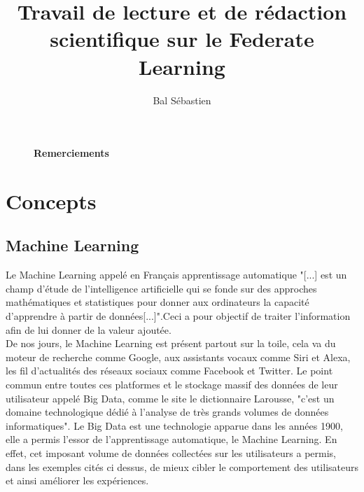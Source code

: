\documentclass[12pt,a4paper]{report}
\begin{document}
\title{\Large{\Large {Travail de lecture et de rédaction scientifique sur le Federate Learning}}}

\author{Bal Sébastien}

\maketitle

\thispagestyle{empty} %





 


\begin{figure}[p]

\large\textbf{Remerciements}


\end{figure}

\tableofcontents
\thispagestyle{empty} %


\chapter{Concepts}
\section{Machine Learning}


\thispagestyle{plain}
\setcounter{page}{1} %


Le Machine Learning appelé en Français apprentissage automatique "[...] est un champ d'étude de l'intelligence artificielle qui se fonde sur des approches mathématiques et statistiques pour donner aux ordinateurs la capacité d'apprendre à partir de données[...]".Ceci a pour objectif de traiter l'information afin de lui donner de la valeur ajoutée.\\

De nos jours, le Machine Learning est présent partout sur la toile, cela va du moteur de recherche comme Google, aux assistants vocaux comme Siri et Alexa, les fil d'actualités des réseaux sociaux comme Facebook et Twitter. Le point commun entre toutes ces platformes et le stockage massif des données de leur utilisateur appelé Big Data, comme le site le dictionnaire Larousse, "c'est un domaine technologique dédié à l'analyse de très grands volumes de données informatiques". Le Big Data est une technologie apparue dans les années 1900, elle a permis l'essor de l'apprentissage automatique, le Machine Learning. En effet, cet imposant volume de données collectées sur les utilisateurs a permis, dans les exemples cités ci dessus, de mieux cibler le comportement des utilisateurs et ainsi améliorer les expériences.\\
\end{document}
